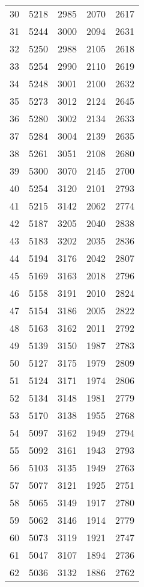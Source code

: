 \begin{center}
\begin{supertabular}{|l|cc|cc|}
      30 & 5218 & 2985 & 2070 & 2617 \\
      31 & 5244 & 3000 & 2094 & 2631 \\
      32 & 5250 & 2988 & 2105 & 2618 \\
      33 & 5254 & 2990 & 2110 & 2619 \\
      34 & 5248 & 3001 & 2100 & 2632 \\
      35 & 5273 & 3012 & 2124 & 2645 \\
      36 & 5280 & 3002 & 2134 & 2633 \\
      37 & 5284 & 3004 & 2139 & 2635 \\
      38 & 5261 & 3051 & 2108 & 2680 \\
      39 & 5300 & 3070 & 2145 & 2700 \\
      40 & 5254 & 3120 & 2101 & 2793 \\
      41 & 5215 & 3142 & 2062 & 2774 \\
      42 & 5187 & 3205 & 2040 & 2838 \\
      43 & 5183 & 3202 & 2035 & 2836 \\
      44 & 5194 & 3176 & 2042 & 2807 \\
      45 & 5169 & 3163 & 2018 & 2796 \\
      46 & 5158 & 3191 & 2010 & 2824 \\
      47 & 5154 & 3186 & 2005 & 2822 \\
      48 & 5163 & 3162 & 2011 & 2792 \\
      49 & 5139 & 3150 & 1987 & 2783 \\
      50 & 5127 & 3175 & 1979 & 2809 \\
      51 & 5124 & 3171 & 1974 & 2806 \\
      52 & 5134 & 3148 & 1981 & 2779 \\
      53 & 5170 & 3138 & 1955 & 2768 \\
      54 & 5097 & 3162 & 1949 & 2794 \\
      55 & 5092 & 3161 & 1943 & 2793 \\
      56 & 5103 & 3135 & 1949 & 2763 \\
      57 & 5077 & 3121 & 1925 & 2751 \\
      58 & 5065 & 3149 & 1917 & 2780 \\
      59 & 5062 & 3146 & 1914 & 2779 \\
      60 & 5073 & 3119 & 1921 & 2747 \\
      61 & 5047 & 3107 & 1894 & 2736 \\
      62 & 5036 & 3132 & 1886 & 2762 \\

\end{supertabular}
\end{center}
